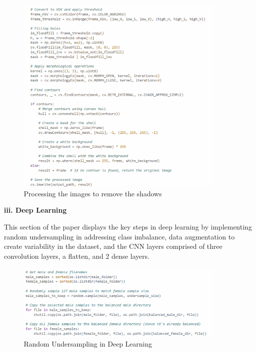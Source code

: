 \begin{figure}[!htbp]
	\centering
	\includegraphics[width=0.9\textwidth, angle=0]{figures/shadow_remove.png}
	\caption{Processing the images to remove the shadows}
\end{figure}

\newpage

\noindent\textbf{iii. Deep Learning}
\vspace{-0.5cm}

This section of the paper displays the key steps in deep learning by implementing random undersampling in addressing class imbalance, data augmentation to create variability in the dataset, and the CNN layers comprised of three convolution layers, a flatten, and 2 dense layers. 


\begin{figure}[!htbp]
	\centering
	\includegraphics[width=0.9\textwidth, angle=0]{figures/random_undersampling_DL.png}
	\caption{Random Undersampling in Deep Learning}
\end{figure}

